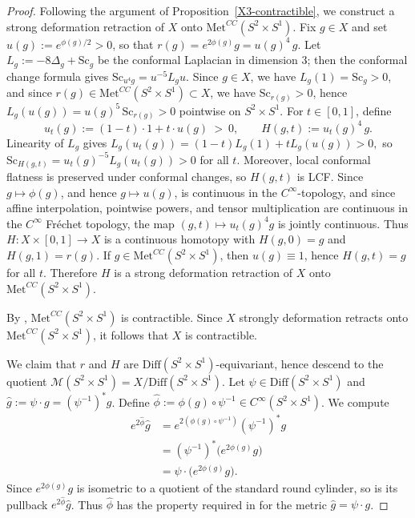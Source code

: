 \documentclass[12pt,oneside,a4paper]{article}
\theoremstyle{mytheorem}
\theoremstyle{remark}
\theoremstyle{definition}
\begin{document}
\begin{proof}
Following the argument of Proposition~\ref{X3-contractible}, we construct a strong deformation retraction of $X$ onto $\mathrm{Met}^{CC}(S^2\times S^1)$. Fix $g\in X$ and set $u(g):=e^{\phi(g)/2}>0$, so that $r(g)=e^{2\phi(g)}g=u(g)^4\,g$.
Let $L_g:=-8\Delta_g+\mathrm{Sc}_g$ be the conformal Laplacian in dimension $3$; then the conformal change formula gives $\mathrm{Sc}_{u^4g}=u^{-5}L_g u$.
Since $g\in X$, we have $L_g(1)=\mathrm{Sc}_g>0$, and since $r(g)\in \mathrm{Met}^{CC}(S^2\times S^1)\subset X$, we have
$\mathrm{Sc}_{r(g)}>0$, hence
\(L_g(u(g))=u(g)^5\,\mathrm{Sc}_{r(g)}>0\)
pointwise on \(S^2\times S^1\).
For $t\in[0,1]$, define
\[
u_t(g):=(1-t)\cdot 1+t\cdot u(g)\ >\ 0,
\qquad
H(g,t):=u_t(g)^4\,g.
\]
Linearity of $L_g$ gives
\(
L_g(u_t(g))=(1-t)L_g(1)+tL_g(u(g))>0,
\)
so $\mathrm{Sc}_{H(g,t)}=u_t(g)^{-5}L_g(u_t(g))>0$ for all $t$.
Moreover, local conformal flatness is preserved under conformal changes, so $H(g,t)$ is LCF.
Since $g\mapsto\phi(g)$, and hence $g\mapsto u(g)$, is continuous in the
$C^\infty$-topology, and since affine interpolation, pointwise powers, and
tensor multiplication are continuous in the $C^\infty$ Fr\'echet topology,
the map $(g,t)\mapsto u_t(g)^4g$ is jointly continuous.
Thus $H\colon X\times[0,1]\to X$ is a continuous homotopy with
$H(g,0)=g$ and $ H(g,1)=r(g).$
If $g\in \mathrm{Met}^{CC}(S^2\times S^1)$, then $u(g)\equiv 1$, hence $H(g,t)=g$ for all $t$.
Therefore $H$ is a strong deformation retraction of $X$ onto $\mathrm{Met}^{CC}(S^2\times S^1)$.


By \cite[Theorem~1.2]{2019arXiv190908710B}, $\mathrm{Met}^{CC}(S^2\times S^1)$ is contractible. Since $X$ strongly deformation retracts onto $\mathrm{Met}^{CC}(S^2\times S^1)$, it follows that $X$ is contractible.


We claim that $r$ and $H$ are $\mathrm{Diff}(S^2\times S^1)$-equivariant, hence descend to the quotient $\mathcal{M}(S^2\times S^1)=X/\mathrm{Diff}(S^2\times S^1)$.
Let $\psi\in \mathrm{Diff}(S^2\times S^1)$ and $\widehat g:=\psi\cdot g=(\psi^{-1})^*g$.
Define
\(\widehat\phi:=\phi(g)\circ\psi^{-1}\in C^\infty(S^2\times S^1)\).
We compute
\[
\begin{aligned}
e^{2\widehat\phi}\widehat g
&=e^{2(\phi(g)\circ\psi^{-1})}(\psi^{-1})^*g\\
&=(\psi^{-1})^*\bigl(e^{2\phi(g)}g\bigr)\\
&=\psi\cdot\bigl(e^{2\phi(g)}g\bigr).
\end{aligned}
\]
Since $e^{2\phi(g)}g$ is isometric to a quotient of the standard round
cylinder, so is its pullback $e^{2\widehat\phi}\widehat g$. Thus
$\widehat\phi$ has the property required in
\cite[Lemma~9.2(b)]{2019arXiv190908710B} for the metric
$\widehat g=\psi\cdot g$.


\end{proof}
\end{document}
